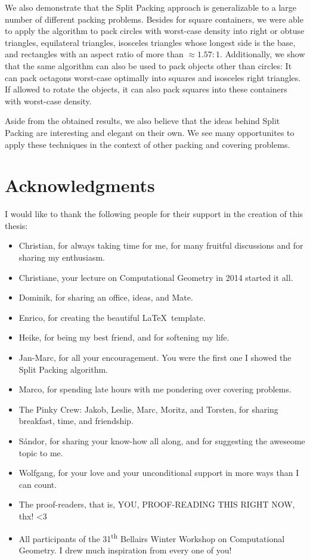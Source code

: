 \documentclass[a4paper,style=print,oneside,bibliography=totoc,nexus,lnum,extramargin]{tubsbook}
\begin{document}
We also demonstrate that the Split Packing approach is generalizable to a large number of different packing problems.
Besides for square containers, we were able to apply the algorithm to pack circles with worst-case density into
right or obtuse triangles,
equilateral triangles,
isosceles triangles whose longest side is the base,
and rectangles with an aspect ratio of more than $\approx \! 1.57:1$.
Additionally, we show that the same algorithm can also be used to pack objects other than circles: It can pack octagons worst-case optimally into squares and isosceles right triangles. If allowed to rotate the objects, it can also pack squares into these containers with worst-case density.

Aside from the obtained results, we also believe that the ideas behind Split Packing are interesting and elegant on their own. We see many opportunites to apply these techniques in the context of other packing and covering problems.

\cleardoublepage

\section*{Acknowledgments}

I would like to thank the following people for their support in the creation of this thesis:

\begin{itemize}
    \item Christian, for always taking time for me, for many fruitful discussions and for sharing my enthusiasm.
    \item Christiane, your lecture on Computational Geometry in 2014 started it all.
    \item Dominik, for sharing an office, ideas, and Mate.
    \item Enrico, for creating the beautiful \LaTeX\ template.
    \item Heike, for being my best friend, and for softening my life.
    \item Jan-Marc, for all your encouragement. You were the first one I showed the Split Packing algorithm.
    \item Marco, for spending late hours with me pondering over covering problems.
    \item The Pinky Crew: Jakob, Leslie, Marc, Moritz, and Torsten, for sharing breakfast, time, and friendship.
    \item Sándor, for sharing your know-how all along, and for suggesting the aweseome topic to me.
    \item Wolfgang, for your love and your unconditional support in more ways than I can count.
    \item The proof-readers, that is, YOU, PROOF-READING THIS RIGHT NOW, thx! <3
    \item All participants of the 31\textsuperscript{th} Bellairs Winter Workshop on Computational Geometry. I drew much inspiration from every one of you!
\end{itemize}
\end{document}
